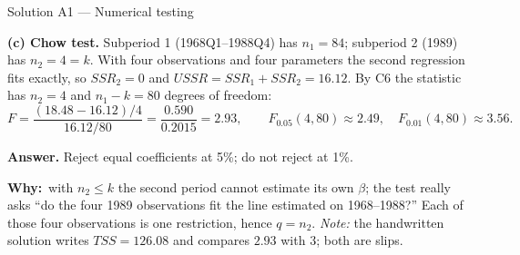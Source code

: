 \documentclass[11pt]{article}
\newcommand{\step}[1]{\par\smallskip\noindent\textbf{\textcolor{qnavy}{#1}}\quad\ignorespaces}
\newcommand{\Why}{\textbf{\textcolor{whyline}{Why:}}\ }
\newcommand{\Ans}[1]{\par\smallskip\noindent\colorbox{qlight}{\parbox{\dimexpr\linewidth-2\fboxsep}{\textbf{Answer.} #1}}\par}
\begin{document}
\begin{solbox}{Solution A1 --- Numerical testing}
\step{(c) Chow test.} Subperiod 1 (1968Q1--1988Q4) has $n_{1} = 84$; subperiod 2
(1989) has $n_{2} = 4 = k$. With four observations and four parameters the second
regression fits exactly, so $SSR_{2} = 0$ and $USSR = SSR_{1} + SSR_{2} = 16.12$. By C6
the statistic has $n_{2} = 4$ and $n_{1} - k = 80$ degrees of freedom:
\[
  F = \frac{(18.48 - 16.12)/4}{16.12/80} = \frac{0.590}{0.2015} = 2.93,
  \qquad F_{0.05}(4,80) \approx 2.49,\quad F_{0.01}(4,80) \approx 3.56 .
\]
\Ans{Reject equal coefficients at 5\%; do not reject at 1\%.}
\begin{why}\Why with $n_{2} \le k$ the second period cannot estimate its own $\beta$;
the test really asks ``do the four 1989 observations fit the line estimated on
1968--1988?'' Each of those four observations is one restriction, hence $q = n_{2}$.
\emph{Note:} the handwritten solution writes $TSS = 126.08$ and compares $2.93$ with
$3$; both are slips.\end{why}
\end{solbox}
\end{document}
